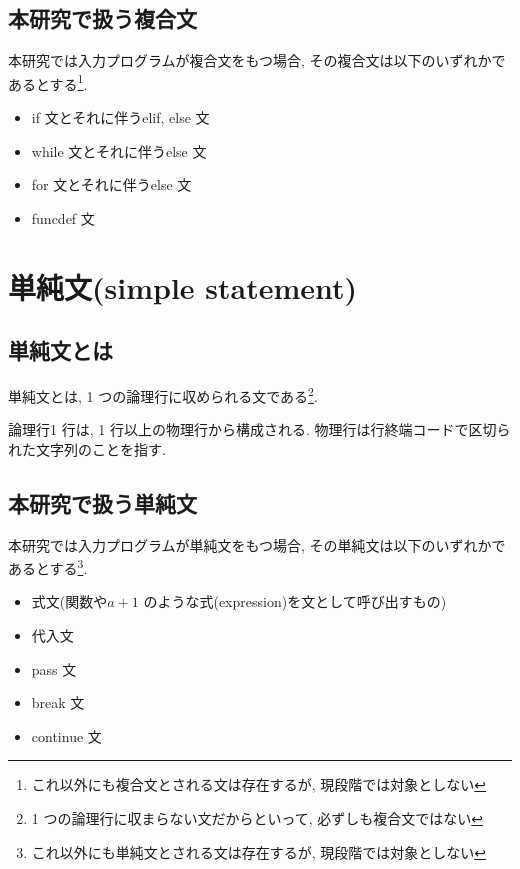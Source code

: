 \documentclass{jlreq}
\begin{document}
        \subsection{本研究で扱う複合文}
            本研究では入力プログラムが複合文をもつ場合, その複合文は以下のいずれかであるとする\footnote{これ以外にも複合文とされる文は存在するが, 現段階では対象としない}.
            \begin{itemize}
                \item if 文とそれに伴うelif, else 文
                \item while 文とそれに伴うelse 文
                \item for 文とそれに伴うelse 文
                \item funcdef 文
            \end{itemize}

    \section{単純文(simple statement)}
        \subsection{単純文とは}
            単純文とは, 1 つの論理行に収められる文である\footnote{1 つの論理行に収まらない文だからといって, 必ずしも複合文ではない}. 
            
            論理行1 行は, 1 行以上の物理行から構成される. 物理行は行終端コードで区切られた文字列のことを指す.

        \subsection{本研究で扱う単純文}
            本研究では入力プログラムが単純文をもつ場合, その単純文は以下のいずれかであるとする\footnote{これ以外にも単純文とされる文は存在するが, 現段階では対象としない}.
            \begin{itemize}
                \item 式文(関数や$a+1$ のような式(expression)を文として呼び出すもの)
                \item 代入文
                \item pass 文
                \item break 文
                \item continue 文
            \end{itemize}
\end{document}
